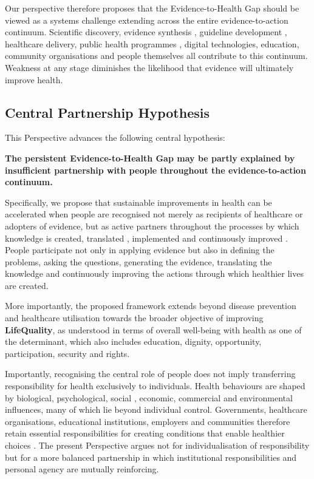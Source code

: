 \documentclass{article}
\begin{document}
Our perspective therefore proposes that the Evidence-to-Health Gap should be viewed as a systems challenge extending across the entire evidence-to-action continuum. Scientific discovery, evidence synthesis \cite{Straus2013} \cite{Greenhalgh2011} , guideline development \cite{IOM2001}, healthcare delivery, public health programmes \cite{WHO1986}, digital technologies, education, community organisations and people themselves all contribute to this continuum. Weakness at any stage diminishes the likelihood that evidence will ultimately improve health.
\subsection{Central Partnership Hypothesis}
\label{sec:orge9e011c}

This Perspective advances the following central hypothesis:

\textbf{\textbf{The persistent Evidence-to-Health Gap may be partly explained by insufficient partnership with people throughout the evidence-to-action continuum.}}

Specifically, we propose that sustainable improvements in health can be accelerated when people are recognised not merely as recipients of healthcare or adopters of evidence, but as active partners throughout the processes by which knowledge is created, translated \cite{Straus2013}, implemented \cite{Eccles2006} and continuously improved \cite{IOM2013}. People participate not only in applying evidence but also in defining the problems, asking the questions, generating the evidence, translating the knowledge and continuously improving the actions through which healthier lives are created.

More importantly, the proposed framework extends beyond disease prevention and healthcare utilisation towards the broader objective of improving \textbf{\textbf{LifeQuality}}, as understood in terms of overall well-being with health as one of the determinant, which also includes education, dignity, opportunity, participation, security and rights.

Importantly, recognising the central role of people does not imply transferring responsibility for health exclusively to individuals. Health behaviours are shaped by biological, psychological, social \cite{Marmot2012} \cite{Bronfenbrenner1979}, economic, commercial and environmental influences, many of which lie beyond individual control. Governments, healthcare organisations, educational institutions, employers and communities therefore retain essential responsibilities for creating conditions that enable healthier choices \cite{WHO1986}. The present Perspective argues not for individualisation of responsibility but for a more balanced partnership in which institutional responsibilities and personal agency are mutually reinforcing.
\end{document}
